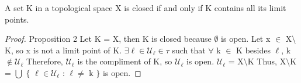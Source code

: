 \documentclass{article}
\begin{document}
	\begin{proposition}
		A set K in a topological space X is closed if and only if K contains all its limit points.
	\end{proposition}
	\begin{proof}
	Proposition 2
	\newline
	Let K = X, then K is closed because $\emptyset$ is open.
	\newline
	Let x $\in$ X$\setminus$K, so x is not a limit point of K.
	\newline
	$\exists \ell \in \mathcal{U}_\ell \in \tau$ such that $\forall$ k $\in$ K besides $\ell$, k $\not\in \mathcal{U}_\ell$
	\newline
	Therefore, $\mathcal{U}_\ell$ is the compliment of K, so $\mathcal{U}_\ell$ is open.
	\newline
	$\mathcal{U}_\ell$ = X$\setminus$K
	\newline
	Thus, X$\setminus$K = $\bigcup$ $\lbrace$ $\ell \in \mathcal{U}_\ell$ : $\ell \neq$ k $\rbrace$ is open. 
	\end{proof}
\end{document}
